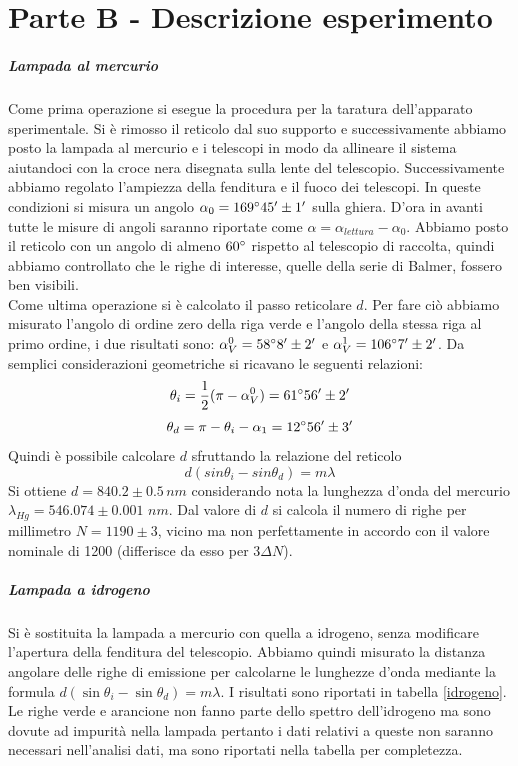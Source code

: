 \documentclass[10pt,a4paper]{article}
\begin{document}
\section{Parte B - Descrizione esperimento}
\subparagraph{Lampada al mercurio}
Come prima operazione si esegue la procedura per la taratura dell'apparato sperimentale. Si è rimosso il reticolo dal suo supporto e successivamente abbiamo posto la lampada al mercurio e i telescopi in modo da allineare il sistema aiutandoci con la croce nera disegnata sulla lente del telescopio. Successivamente abbiamo regolato l'ampiezza della fenditura e il fuoco dei telescopi. In queste condizioni si misura un angolo $\alpha_0 = 169 \degree 45 '\pm 1'$ sulla ghiera. D'ora in avanti tutte le misure di angoli saranno riportate come $\alpha=\alpha_{lettura}-\alpha_0$. Abbiamo posto il reticolo con un angolo di almeno $60\degree$ rispetto al telescopio di raccolta, quindi abbiamo controllato che le righe di interesse, quelle della serie di Balmer, fossero ben visibili.\\
Come ultima operazione si è calcolato il passo reticolare $d$. Per fare ciò abbiamo misurato l'angolo di ordine zero della riga verde e l'angolo della stessa riga al primo ordine, i due risultati sono: $\alpha_V^{0} = 58 \degree 8 ' \pm 2'$ e $\alpha_V^{1} = 106 \degree 7' \pm 2'$. Da semplici considerazioni geometriche si ricavano le seguenti relazioni:
\begin{equation}
\theta_i=\frac{1}{2}(\pi-\alpha_V^{0})=61\degree 56'\pm2'
\end{equation}
\begin{equation}
\theta_d=\pi-\theta_i-\alpha_1= 12 \degree 56' \pm 3'
\end{equation}
Quindi è possibile calcolare $d$ sfruttando la relazione del reticolo 
\begin{equation}
d(sin{\theta_i}-sin{\theta_d})=m\lambda
\end{equation}
Si ottiene $d = 840.2 \pm 0.5 \,nm$ considerando nota la lunghezza d'onda del mercurio $\lambda_{Hg}=546.074\pm0.001\,\,nm$. Dal valore di $d$ si calcola il numero di righe per millimetro $N = 1190 \pm 3$, vicino ma non perfettamente in accordo con il valore nominale di 1200 (differisce da esso per $3 \Delta N$).

\subparagraph{Lampada a idrogeno}
Si è sostituita la lampada a mercurio con quella a idrogeno, senza modificare l'apertura della fenditura del telescopio. Abbiamo quindi misurato la distanza angolare delle righe di emissione per calcolarne le lunghezze d'onda mediante la formula $d(\sin{\theta_i}-\sin{\theta_d})=m\lambda$. I risultati sono riportati in tabella \ref{idrogeno}. Le righe verde e arancione non fanno parte dello spettro dell'idrogeno ma sono dovute ad impurità nella lampada pertanto i dati relativi a queste non saranno necessari nell'analisi dati, ma sono riportati nella tabella per completezza.\\
\end{document}
